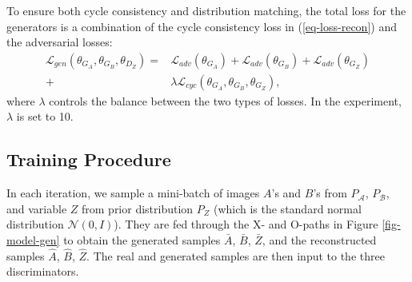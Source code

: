 \documentclass[conference]{IEEEtran}
\theoremstyle{definition}
\begin{document}

To ensure both cycle consistency and distribution matching, the total loss for the generators is a combination of the cycle consistency loss in (\ref{eq-loss-recon}) and the adversarial losses:
\begin{align}
\mathcal L_{gen}(\theta_{G_A}, \theta_{G_B}, \theta_{D_Z}) =& \mathcal L_{adv}(\theta_{G_{A}}) + \mathcal L_{adv}(\theta_{G_{B}}) + \mathcal L_{adv}(\theta_{G_{Z}}) \nonumber \\
+&\lambda \mathcal L_{cyc}(\theta_{G_A}, \theta_{G_B}, \theta_{G_Z}),
\label{eq-loss-total}
\end{align}
where $\lambda$ controls the balance between the two types of losses. In the experiment, $\lambda$ is set to 10.


\subsection{Training Procedure}

In each iteration, we sample a mini-batch of images $A$'s and $B$'s from $P_{\mathcal A}$, $P_{\mathcal B}$, and variable $Z$ from prior distribution $P_{Z}$ (which is the standard normal distribution $\mathcal N(0, I)$). They are fed through the X- and O-paths in Figure \ref{fig-model-gen} to obtain the generated samples $\bar{A}$, $\bar{B}$, $\bar{Z}$, and the reconstructed samples $\hat{A}$, $\hat{B}$, $\hat{Z}$. The real and generated samples are then input to the three discriminators.
\end{document}

